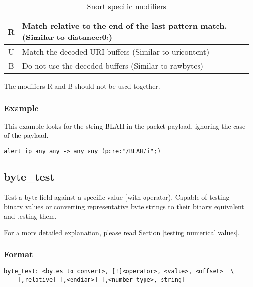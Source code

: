 \documentclass[english]{report}
\begin{document}
\begin{longtable}{|c|p{3.5in}|}
\caption{Snort specific modifiers} \\
\hline
R & Match relative to the end of the last pattern match.  (Similar to distance:0;) \\
\hline
U & Match the decoded URI buffers (Similar to uricontent) \\
\hline
B & Do not use the decoded buffers (Similar to rawbytes) \\
\hline
\end{longtable}

The modifiers R and B should not be used together.

\subsubsection{Example}

This example looks for the string BLAH in the packet payload, ignoring the case of the payload.

\begin{verbatim}
alert ip any any -> any any (pcre:"/BLAH/i";)
\end{verbatim}


\subsection{byte\_test\label{sub:byte_test}}

Test a byte field against a specific value (with operator).  Capable
 of testing binary values or converting representative byte strings to
their binary equivalent and testing them.  

For a more detailed explanation, please read Section \ref{testing numerical values}.

\subsubsection{Format}

\begin{verbatim}
byte_test: <bytes to convert>, [!]<operator>, <value>, <offset>  \
    [,relative] [,<endian>] [,<number type>, string]
\end{verbatim}
\end{document}
